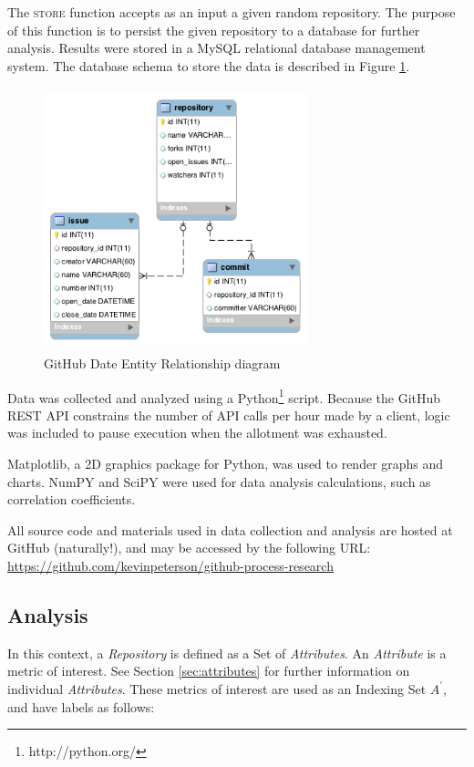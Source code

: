 \documentclass{proc}
\begin{document}
The \textsc{store} function accepts as an input a given random repository. The purpose of this function is to persist the given repository to a database for further analysis. Results were stored in a MySQL relational database management system. The database schema to store the data is described in Figure \ref{fig:er_diagram}.

\begin{figure}
\includegraphics[height=3in,width=3in]{images/er.png}
\caption{GitHub Date Entity Relationship diagram}
\label{fig:er_diagram}
\end{figure}

Data was collected and analyzed using a Python\footnote{http://python.org/} script. Because the GitHub REST API constrains the number of API calls per hour made by a client, logic was included to pause execution when the allotment was exhausted.

Matplotlib\cite{Hunter2007}, a 2D graphics package for Python, was used to render graphs and charts. NumPY and SciPY\cite{scipy} were used for data analysis calculations, such as correlation coefficients.

All source code and materials used in data collection and analysis are hosted at GitHub (naturally!), and may be accessed by the following URL: \url{https://github.com/kevinpeterson/github-process-research}

\subsection{Analysis}
In this context, a \textit{Repository} is defined as a Set of \textit{Attributes}. An \textit{Attribute} is a metric of interest. See Section \ref{sec:attributes} for further information on individual \textit{Attributes}. These metrics of interest are used as an Indexing Set $A^\prime$, and have labels as follows:
\end{document}
